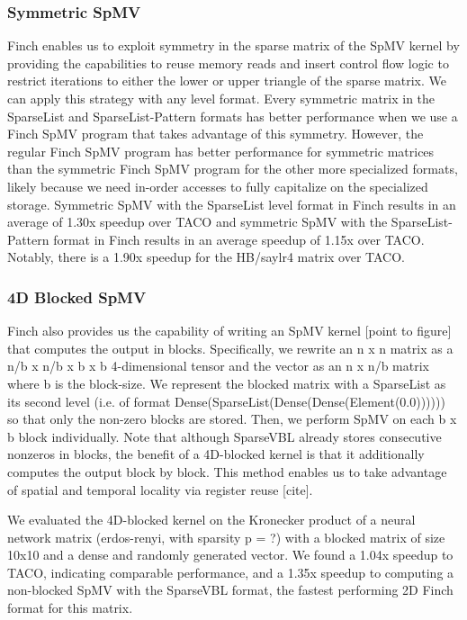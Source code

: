 \subsubsection{Symmetric SpMV}
Finch enables us to exploit symmetry in the sparse matrix of the SpMV kernel by providing the capabilities to reuse memory reads and insert control flow logic to restrict iterations to either the lower or upper triangle of the sparse matrix. We can apply this strategy with any level format. Every symmetric matrix in the SparseList and SparseList-Pattern formats has better performance when we use a Finch SpMV program that takes advantage of this symmetry. However, the regular Finch SpMV program has better performance for symmetric matrices than the symmetric Finch SpMV program for the other more specialized formats, likely because we need in-order accesses to fully capitalize on the specialized storage. Symmetric SpMV with the SparseList level format in Finch results in an average of 1.30x speedup over TACO and symmetric SpMV with the SparseList-Pattern format in Finch results in an average speedup of 1.15x over TACO. Notably, there is a 1.90x speedup for the HB/saylr4 matrix over TACO. 

\subsubsection{4D Blocked SpMV}
Finch also provides us the capability of writing an SpMV kernel [point to figure] that computes the output in blocks. Specifically, we rewrite an n x n matrix as a n/b x n/b x b x b 4-dimensional tensor and the vector as an n x n/b matrix where b is the block-size. We represent the blocked matrix with a SparseList as its second level (i.e. of format Dense(SparseList(Dense(Dense(Element(0.0)))))) so that only the non-zero blocks are stored. Then, we perform SpMV on each b x b block individually. Note that although SparseVBL already stores consecutive nonzeros in blocks, the benefit of a 4D-blocked kernel is that it additionally computes the output block by block. This method enables us to take advantage of spatial and temporal locality via register reuse [cite].

We evaluated the 4D-blocked kernel on the Kronecker product of a neural network matrix (erdos-renyi, with sparsity p = ?) with a blocked matrix of size 10x10 and a dense and randomly generated vector. We found a 1.04x speedup to TACO, indicating comparable performance, and a 1.35x speedup to computing a non-blocked SpMV with the SparseVBL format, the fastest performing 2D Finch format for this matrix. 

